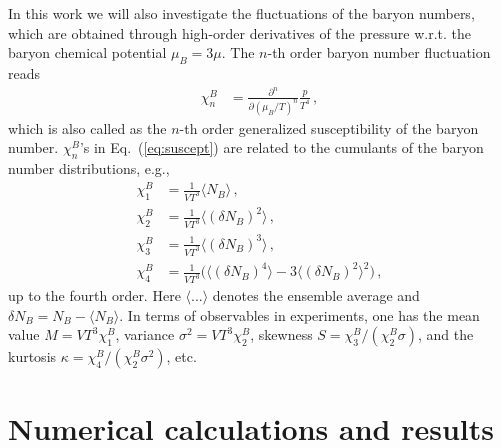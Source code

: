 \documentclass[%
reprint,
superscriptaddress,
showpacs,preprintnumbers,
 amsmath,amssymb,
 aps,
prd,
]{revtex4-1}
\def\Eq#1{Eq.~(\ref{#1})}
\begin{document}
In this work we will also investigate the fluctuations of the baryon numbers, which are obtained through high-order derivatives of the pressure w.r.t. the baryon chemical potential $\mu_B=3\mu$. The $n$-th order baryon number fluctuation reads
\begin{align}
   \chi_n^{B}&=\frac{\partial^n}{\partial (\mu_B/T)^n}\frac{p}{T^4}\,,\label{eq:suscept}
\end{align}
which is also called as the $n$-th order generalized susceptibility of the baryon number. $ \chi_n^{B}$'s in \Eq{eq:suscept} are related to the cumulants of the baryon number distributions, e.g.,
\begin{align}
  \chi_1^B&=\frac{1}{VT^3}\langle N_B \rangle\,,\\[2ex]
  \chi_2^B&=\frac{1}{VT^3}\langle(\delta N_B)^2\rangle\,,\\[2ex]
  \chi_3^B&=\frac{1}{VT^3}\langle(\delta N_B)^3\rangle\,,\\[2ex]
  \chi_4^B&=\frac{1}{VT^3}\Big(\langle(\delta N_B)^4\rangle-3\langle(\delta N_B)^2\rangle^2\Big)\,,
\end{align}
up to the fourth order. Here $\langle ...\rangle$ denotes the ensemble average and $\delta N_B=N_B-\langle N_B\rangle$. 
In terms of observables in experiments, one has the mean value $M=VT^3\chi_1^{B}$, variance $\sigma^2=VT^3\chi_2^{B}$, skewness $S=\chi_3^{B}/(\chi_2^{B}\sigma)$, and the kurtosis $\kappa=\chi_4^{B}/(\chi_2^{B}\sigma^2)$, etc.



\section{Numerical calculations and results}
\label{sec:num}
\end{document}
